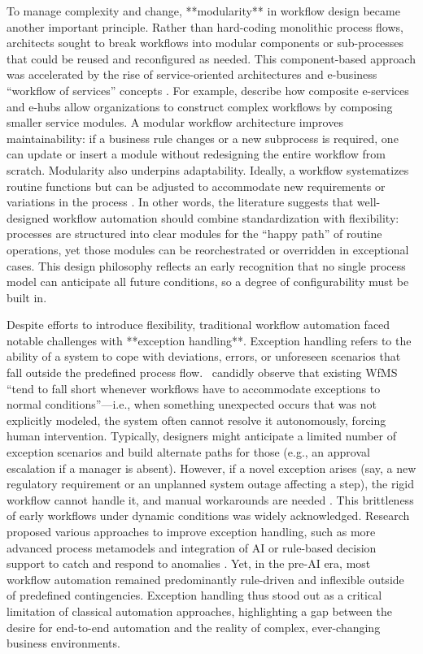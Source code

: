 To manage complexity and change, **modularity** in workflow design became another important principle. Rather than hard-coding monolithic process flows, architects sought to break workflows into modular components or sub-processes that could be reused and reconfigured as needed. This component-based approach was accelerated by the rise of service-oriented architectures and e-business “workflow of services” concepts \parencite{basuResearch2002}. For example, \textcite{basuResearch2002} describe how composite e-services and e-hubs allow organizations to construct complex workflows by composing smaller service modules. A modular workflow architecture improves maintainability: if a business rule changes or a new subprocess is required, one can update or insert a module without redesigning the entire workflow from scratch. Modularity also underpins adaptability. Ideally, a workflow systematizes routine functions but can be adjusted to accommodate new requirements or variations in the process \parencite{basuResearch2002}. In other words, the literature suggests that well-designed workflow automation should combine standardization with flexibility: processes are structured into clear modules for the “happy path” of routine operations, yet those modules can be reorchestrated or overridden in exceptional cases. This design philosophy reflects an early recognition that no single process model can anticipate all future conditions, so a degree of configurability must be built in.

Despite efforts to introduce flexibility, traditional workflow automation faced notable challenges with **exception handling**. Exception handling refers to the ability of a system to cope with deviations, errors, or unforeseen scenarios that fall outside the predefined process flow.~\textcite{basuResearch2002} candidly observe that existing WfMS “tend to fall short whenever workflows have to accommodate exceptions to normal conditions”---i.e., when something unexpected occurs that was not explicitly modeled, the system often cannot resolve it autonomously, forcing human intervention. Typically, designers might anticipate a limited number of exception scenarios and build alternate paths for those (e.g., an approval escalation if a manager is absent). However, if a novel exception arises (say, a new regulatory requirement or an unplanned system outage affecting a step), the rigid workflow cannot handle it, and manual workarounds are needed \parencite{basuResearch2002}. This brittleness of early workflows under dynamic conditions was widely acknowledged. Research proposed various approaches to improve exception handling, such as more advanced process metamodels and integration of AI or rule-based decision support to catch and respond to anomalies \parencite{basuResearch2002}. Yet, in the pre-AI era, most workflow automation remained predominantly rule-driven and inflexible outside of predefined contingencies. Exception handling thus stood out as a critical limitation of classical automation approaches, highlighting a gap between the desire for end-to-end automation and the reality of complex, ever-changing business environments.

